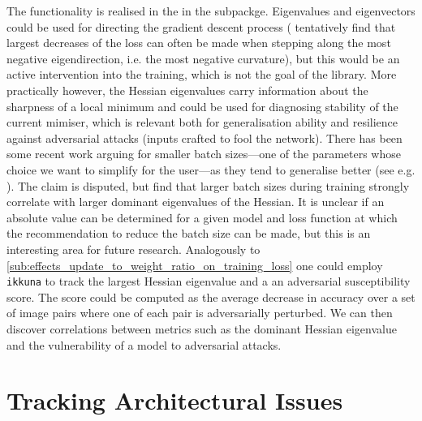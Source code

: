 The functionality is realised in the  in the
 subpackge. Eigenvalues and eigenvectors could
be used for directing the gradient descent process (\citet{alain2018negative}
tentatively find that largest decreases of the loss can often be made when
stepping along the most negative eigendirection, i.e. the most negative
curvature), but this would be an active intervention into the training, which is
not the goal of the library. More practically however, the Hessian eigenvalues
carry information about the sharpness of a local minimum and could be used for
diagnosing stability of the current mimiser, which is relevant both for
generalisation ability and resilience against adversarial attacks (inputs
crafted to fool the network). There has been some recent work arguing for
smaller batch sizes---one of the parameters whose choice we want to simplify
for the user---as they tend to generalise better (see e.g.
\citep{keskar2016large}). The claim is disputed, but \citet{yao2018hessian} find
that larger batch sizes during training strongly correlate with larger dominant
eigenvalues of the Hessian. It is unclear if an absolute value can be determined
for a given model and loss function at which the recommendation to reduce the
batch size can be made, but this is an interesting area for future research.
Analogously to \cref{sub:effects_update_to_weight_ratio_on_training_loss} one
could employ \texttt{ikkuna} to track the largest Hessian eigenvalue and a an
adversarial susceptibility score. The score could be computed as the average
decrease in accuracy over a set of image pairs where one of each pair is
adversarially perturbed. We can then discover correlations between metrics such
as the dominant Hessian eigenvalue and the vulnerability of a model to
adversarial attacks.


\section{Tracking Architectural Issues}%
\label{sec:tracking_architecture}


